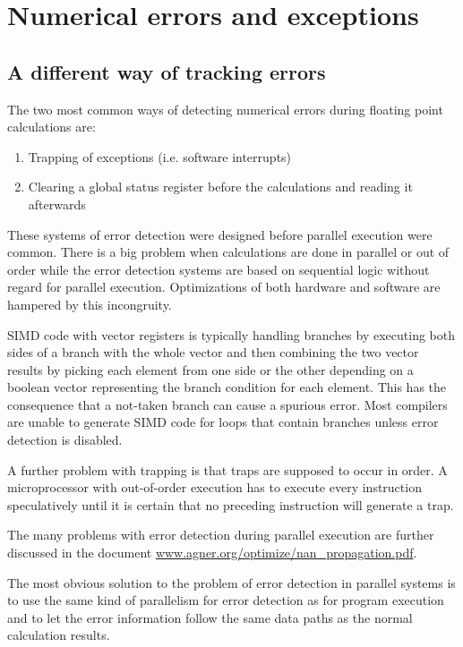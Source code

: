 \documentclass[forwardcom.tex]{subfiles}
\begin{document}
\RaggedRight


\chapter{Numerical errors and exceptions}

\section{A different way of tracking errors}
\label{ADifferentWayOfTrackingErrors}
The two most common ways of detecting numerical errors during floating point calculations are:
\begin{enumerate}
  \item Trapping of exceptions (i.e. software interrupts)
  \item Clearing a global status register before the calculations and reading it afterwards
\end{enumerate}

These systems of error detection were designed before parallel execution were common. There is a big problem when calculations are done in parallel or out of order while the error detection systems are based on sequential logic without regard for parallel execution. Optimizations of both hardware and software are hampered by this incongruity.
\vv

SIMD code with vector registers is typically handling branches by executing both sides of a branch with the whole vector and then combining the two vector results by picking each element from one side or the other depending on a boolean vector representing the branch condition for each element. This has the consequence that a not-taken branch can cause a spurious error. Most compilers are unable to generate SIMD code for loops that contain branches unless error detection is disabled.
\vv

A further problem with trapping is that traps are supposed to occur in order. A microprocessor with out-of-order execution has to execute every instruction speculatively until it is certain that no preceding instruction will generate a trap.
\vv

The many problems with error detection during parallel execution are further discussed in the document 
\href{https://www.agner.org/optimize/nan_propagation.pdf}{www.agner.org/optimize/nan\_propagation.pdf}.
\vv

The most obvious solution to the problem of error detection in parallel systems is to use the same kind of parallelism for error detection as for program execution and to let the error information follow the same data paths as the normal calculation results.
\vv
\end{document}
